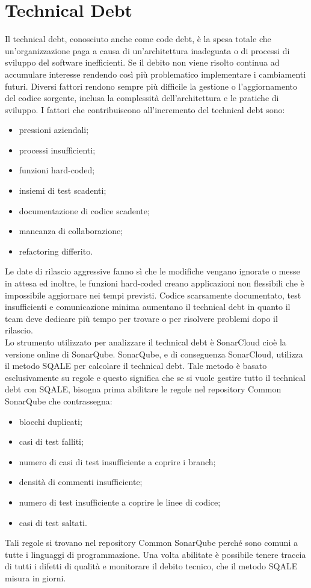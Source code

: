 \section{Technical Debt}
Il technical debt, conosciuto anche come code debt, è la spesa totale che un'organizzazione paga a causa di un'architettura inadeguata o di processi di sviluppo del software inefficienti. Se il debito non viene risolto continua ad accumulare interesse rendendo così più problematico implementare i cambiamenti futuri. Diversi fattori rendono sempre più difficile la gestione o l'aggiornamento del codice sorgente, inclusa la complessità dell'architettura e le pratiche di sviluppo. I fattori che contribuiscono all'incremento del technical debt sono:
\begin{itemize}
\item pressioni aziendali;
\item processi insufficienti;
\item funzioni hard-coded;
\item insiemi di test scadenti;
\item documentazione di codice scadente;
\item mancanza di collaborazione;
\item refactoring differito.
\end{itemize}
Le date di rilascio aggressive fanno sì che le modifiche vengano ignorate o messe in attesa ed inoltre, le funzioni hard-coded creano applicazioni non flessibili che è impossibile aggiornare nei tempi previsti. Codice scarsamente documentato, test insufficienti e comunicazione minima aumentano il technical debt in quanto il team deve dedicare più tempo per trovare o per risolvere problemi dopo il rilascio.\\ 
Lo strumento utilizzato per analizzare il technical debt è SonarCloud cioè la versione online di SonarQube. SonarQube, e di conseguenza SonarCloud, utilizza il metodo SQALE per calcolare il technical debt. Tale metodo è basato esclusivamente su regole e questo significa che se si vuole gestire tutto il technical debt con SQALE, bisogna prima abilitare le regole nel repository Common SonarQube che contrassegna:
\begin{itemize}
\item blocchi duplicati;
\item casi di test falliti;
\item numero di casi di test insufficiente a coprire i branch;
\item densità di commenti insufficiente;
\item numero di test insufficiente a coprire le linee di codice;
\item casi di test saltati.
\end{itemize}
Tali regole si trovano nel repository Common SonarQube perché sono comuni a tutte i linguaggi di programmazione. Una volta abilitate è possibile tenere traccia di tutti i difetti di qualità e monitorare il debito tecnico, che il metodo SQALE misura in giorni.
